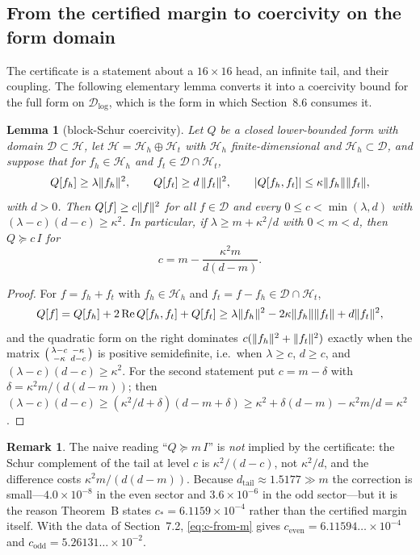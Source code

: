 \documentclass[11pt,a4paper]{article}
\newcommand{\Dlog}{\mathcal D_{\log}}
\renewcommand{\Re}{\operatorname{Re}}
\newcommand{\Hcal}{\mathcal H}
\DeclarePairedDelimiter{\abs}{\lvert}{\rvert}
\DeclarePairedDelimiter{\norm}{\lVert}{\rVert}
\theoremstyle{plain}
\newtheorem{lemma}[theorem]{Lemma}
\theoremstyle{definition}
\newtheorem{remark}[theorem]{Remark}
\numberwithin{equation}{section}
\begin{document}
\subsection{From the certified margin to coercivity on the form domain}

The certificate is a statement about a $16\times16$ head, an infinite tail,
and their coupling. The following elementary lemma converts it into a
coercivity bound for the full form on $\Dlog$, which is the form in which
Section~8.6 consumes it.

\begin{lemma}[block-Schur coercivity]\label{lem:block-schur}
Let $Q$ be a closed lower-bounded form with domain $\mathcal D\subset\Hcal$, let
$\Hcal=\Hcal_h\oplus\Hcal_t$ with $\Hcal_h$ finite-dimensional and
$\Hcal_h\subset\mathcal D$, and suppose that for $f_h\in\Hcal_h$ and
$f_t\in\mathcal D\cap\Hcal_t$,
\[
Q[f_h]\ge\lambda\norm{f_h}^2,\qquad
Q[f_t]\ge d\,\norm{f_t}^2,\qquad
\abs{Q[f_h,f_t]}\le\kappa\norm{f_h}\norm{f_t},
\]
with $d>0$. Then $Q[f]\ge c\norm f^2$ for all $f\in\mathcal D$ and every
$0\le c<\min(\lambda,d)$ with $(\lambda-c)(d-c)\ge\kappa^2$. In particular, if
$\lambda\ge m+\kappa^2/d$ with $0<m<d$, then $Q\succeq c\,I$ for
\begin{equation}\label{eq:c-from-m}
c=m-\frac{\kappa^2m}{d(d-m)} .
\end{equation}
\end{lemma}

\begin{proof}
For $f=f_h+f_t$ with $f_h\in\Hcal_h$ and $f_t=f-f_h\in\mathcal D\cap\Hcal_t$,
\[
Q[f]=Q[f_h]+2\Re Q[f_h,f_t]+Q[f_t]
\ge\lambda\norm{f_h}^2-2\kappa\norm{f_h}\norm{f_t}+d\norm{f_t}^2,
\]
and the quadratic form on the right dominates $c(\norm{f_h}^2+\norm{f_t}^2)$
exactly when the matrix $\begin{psmallmatrix}\lambda-c&-\kappa\\-\kappa&d-c\end{psmallmatrix}$
is positive semidefinite, i.e.\ when $\lambda\ge c$, $d\ge c$, and
$(\lambda-c)(d-c)\ge\kappa^2$. For the second statement put $c=m-\delta$ with
$\delta=\kappa^2m/(d(d-m))$; then
$(\lambda-c)(d-c)\ge(\kappa^2/d+\delta)(d-m+\delta)\ge\kappa^2+\delta(d-m)-\kappa^2m/d=\kappa^2$.
\end{proof}

\begin{remark}\label{rem:not-m}
The naive reading ``$Q\succeq m\,I$'' is \emph{not} implied by the
certificate: the Schur complement of the tail at level $c$ is
$\kappa^2/(d-c)$, not $\kappa^2/d$, and the difference costs
$\kappa^2m/(d(d-m))$. Because $d_{\mathrm{tail}}\approx1.5177\gg m$ the
correction is small---$4.0\times10^{-8}$ in the even sector and
$3.6\times10^{-6}$ in the odd sector---but it is the reason Theorem~B states
$c_*=6.1159\times10^{-4}$ rather than the certified margin itself. With the
data of Section~7.2, \eqref{eq:c-from-m} gives
$c_{\mathrm{even}}=6.11594\ldots\times10^{-4}$ and
$c_{\mathrm{odd}}=5.26131\ldots\times10^{-2}$.
\end{remark}
\end{document}
